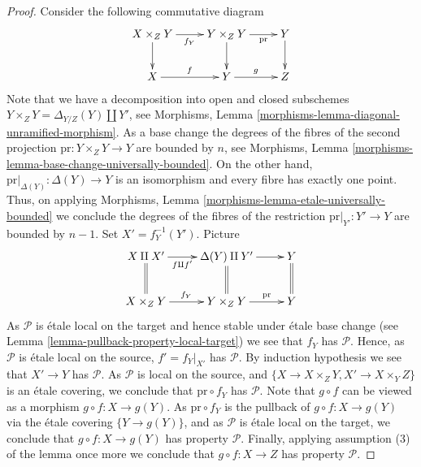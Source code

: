 \begin{proof}
\medskip\noindent
Consider the following commutative diagram
$$
\xymatrix{
X \times_Z Y \ar[d] \ar[r]_{f_Y} &
Y \times_Z Y \ar[d] \ar[r]_-{\text{pr}} &
Y \ar[d] \\
X \ar[r]^f &
Y \ar[r]^g &
Z
}
$$
Note that we have a decomposition into open and closed
subschemes $Y \times_Z Y = \Delta_{Y/Z}(Y) \amalg Y'$, see
Morphisms, Lemma \ref{morphisms-lemma-diagonal-unramified-morphism}.
As a base change the degrees of the fibres of the second projection
$\text{pr} : Y \times_Z Y \to Y$ are bounded by $n$, see
Morphisms, Lemma \ref{morphisms-lemma-base-change-universally-bounded}.
On the other hand, $\text{pr}|_{\Delta(Y)} : \Delta(Y) \to Y$ is
an isomorphism and every fibre has exactly one point.
Thus, on applying
Morphisms, Lemma \ref{morphisms-lemma-etale-universally-bounded}
we conclude the degrees of the fibres of the restriction
$\text{pr}|_{Y'} : Y' \to Y$ are bounded by $n - 1$.
Set $X' = f_Y^{-1}(Y')$. Picture
$$
\xymatrix{
X \amalg X' \ar@{=}[d] \ar[r]_-{f \amalg f'} &
\Delta(Y) \amalg Y' \ar@{=}[d] \ar[r] &
Y \ar@{=}[d] \\
X \times_Z Y \ar[r]^{f_Y} &
Y \times_Z Y \ar[r]^-{\text{pr}} &
Y
}
$$
As $\mathcal{P}$ is \'etale local on the target and hence stable under
\'etale base change (see
Lemma \ref{lemma-pullback-property-local-target})
we see that $f_Y$ has $\mathcal{P}$.
Hence, as $\mathcal{P}$ is \'etale local on the source,
$f' = f_Y|_{X'}$ has $\mathcal{P}$. By induction hypothesis
we see that $X' \to Y$ has $\mathcal{P}$.
As $\mathcal{P}$ is local on the source, and
$\{X \to X \times_Z Y, X' \to X \times_Y Z\}$ is an \'etale covering,
we conclude that $\text{pr} \circ f_Y$ has $\mathcal{P}$.
Note that $g \circ f$ can be viewed as a morphism
$g \circ f : X \to g(Y)$. As $\text{pr} \circ f_Y$ is the pullback of
$g \circ f : X \to g(Y)$ via the \'etale covering $\{Y \to g(Y)\}$,
and as $\mathcal{P}$ is \'etale local on the target, we conclude that
$g \circ f : X \to g(Y)$ has property $\mathcal{P}$. Finally, applying
assumption (3) of the lemma once more we conclude that
$g \circ f : X \to Z$ has property $\mathcal{P}$.
\end{proof}

